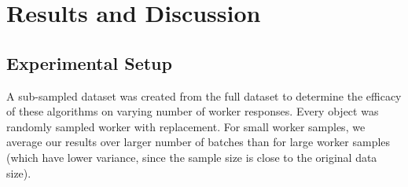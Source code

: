 \section{Results and Discussion\label{sec:results}}

  \subsection{Experimental Setup}
    \par  A sub-sampled dataset was created from the full dataset to determine the efficacy of these algorithms on varying number of worker responses. Every object was randomly sampled worker with replacement. For small worker samples, we average our results over larger number of batches than for large worker samples (which have lower variance, since the sample size is close to the original data size).
  

